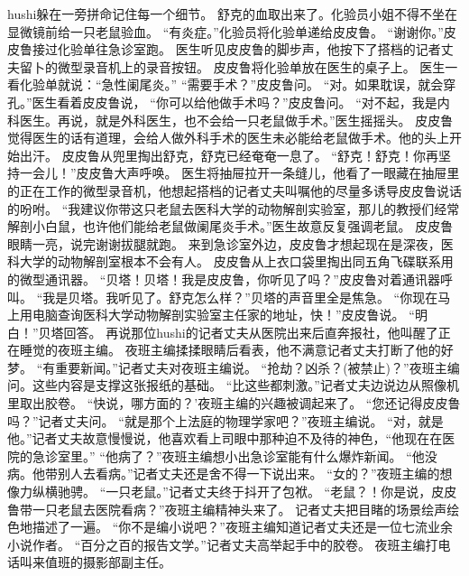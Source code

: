 \documentclass[a4paper,12pt,UTF8,twoside]{ctexbook}
\begin{document}
        hushi躲在一旁拼命记住每一个细节。 
        舒克的血取出来了。化验员小姐不得不坐在显微镜前给一只老鼠验血。 
        “有炎症。”化验员将化验单递给皮皮鲁。 
        “谢谢你。”皮皮鲁接过化验单往急诊室跑。 
        医生听见皮皮鲁的脚步声，他按下了搭档的记者丈夫留卜的微型录音机上的录音按钮。 
        皮皮鲁将化验单放在医生的桌子上。 
        医生一看化验单就说：“急性阑尾炎。” 
        “需要手术？”皮皮鲁问。 
        “对。如果耽误，就会穿孔。”医生看着皮皮鲁说， 
        “你可以给他做手术吗？”皮皮鲁问。 
        “对不起，我是内科医生。再说，就是外科医生，也不会给一只老鼠做手术。”医生摇摇头。 
        皮皮鲁觉得医生的话有道理，会给人做外科手术的医生未必能给老鼠做手术。他的头上开始出汗。 
        皮皮鲁从兜里掏出舒克，舒克已经奄奄一息了。 
        “舒克！舒克！你再坚持一会儿！”皮皮鲁大声呼唤。 
        医生将抽屉拉开一条缝儿，他看了一眼藏在抽屉里的正在工作的微型录音机，他想起搭档的记者丈夫叫嘱他的尽量多诱导皮皮鲁说话的吩咐。 
        “我建议你带这只老鼠去医科大学的动物解剖实验室，那儿的教授们经常解剖小白鼠，也许他们能给老鼠做阑尾炎手术。”医生故意反复强调老鼠。 
        皮皮鲁眼睛一亮，说完谢谢拔腿就跑。 
        来到急诊室外边，皮皮鲁才想起现在是深夜，医科大学的动物解剖室根本不会有人。 
        皮皮鲁从上衣口袋里掏出同五角飞碟联系用的微型通讯器。 
        “贝塔！贝塔！我是皮皮鲁，你听见了吗？”皮皮鲁对着通讯器呼叫。 
        “我是贝塔。我听见了。舒克怎么样？”贝塔的声音里全是焦急。 
        “你现在马上用电脑查询医科大学动物解剖实验室主任家的地址，快！”皮皮鲁说。 
        “明白！”贝塔回答。 
        再说那位hushi的记者丈夫从医院出来后直奔报社，他叫醒了正在睡觉的夜班主编。 
        夜班主编揉揉眼睛后看表，他不满意记者丈夫打断了他的好梦。 
        “有重要新闻。”记者丈夫对夜班主编说。 
        “抢劫？凶杀？(被禁止)？”夜班主编问。这些内容是支撑这张报纸的基础。 
        “比这些都刺激。”记者丈夫边说边从照像机里取出胶卷。 
        “快说，哪方面的？’夜班主编的兴趣被调起来了。 
        “您还记得皮皮鲁吗？”记者丈夫问。 
        “就是那个上法庭的物理学家吧？”夜班主编说。 
        “对，就是他。”记者丈夫故意慢慢说，他喜欢看上司眼中那种迫不及待的神色，“他现在在医院的急诊室里。” 
        “他病了？”夜班主编想小出急诊室能有什么爆炸新闻。 
        “他没病。他带别人去看病。”记者丈夫还是舍不得一下说出来。 
        “女的？”夜班主编的想像力纵横驰骋。 
        “一只老鼠。”记者丈夫终于抖开了包袱。 
        “老鼠？！你是说，皮皮鲁带一只老鼠去医院看病？”夜班主编精神头来了。 
        记者丈夫把目睹的场景绘声绘色地描述了一遍。 
        “你不是编小说吧？”夜班主编知道记者丈夫还是一位七流业余小说作者。 
        “百分之百的报告文学。”记者丈夫高举起手中的胶卷。 
        夜班主编打电话叫来值班的摄影部副主任。 
\end{document}
